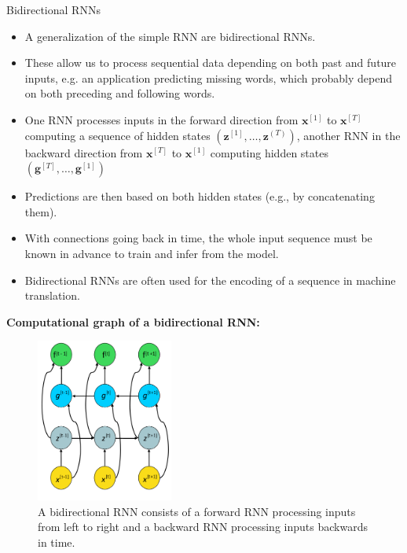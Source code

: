 \begin{vbframe}{Bidirectional RNNs}
  \begin{itemize}
    \item A generalization of the simple RNN are bidirectional RNNs.
    \item These allow us to process sequential data depending on both past and future inputs, e.g. an application predicting missing words, which probably depend on both preceding and following words.
    \item One RNN processes inputs in the forward direction from $\mathbf{x}^{[1]}$ to $\mathbf{x}^{[T]}$ computing a sequence of hidden states $(\mathbf{z}^{[1]}, \dots, \mathbf{z}^{(T)})$, another RNN in the backward direction from $\mathbf{x}^{[T]}$ to $\mathbf{x}^{[1]}$ computing hidden states $(\mathbf{g}^{[T]}, \dots, \mathbf{g}^{[1]})$
    \item Predictions are then based on both hidden states (e.g., by concatenating them).
    \item With connections going back in time, the whole input sequence must be known in advance
to train and infer from the model.
    \item Bidirectional RNNs are often used for the encoding of a sequence in machine translation.
  \end{itemize}
\framebreak  
\textbf{Computational graph of a bidirectional RNN:}
  \begin{figure}
    \includegraphics[width=4.5cm]{figure/bidirectional_rnn.png}
    \caption{A bidirectional RNN consists of a forward RNN processing inputs from left to right and a backward RNN processing inputs backwards in time.}
  \end{figure} 
\end{vbframe}


